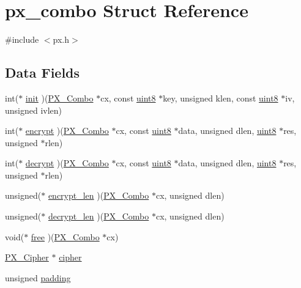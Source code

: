 \hypertarget{structpx__combo}{\section{px\-\_\-combo Struct Reference}
\label{structpx__combo}
}


{\ttfamily \#include $<$px.\-h$>$}

\subsection*{Data Fields}
\begin{DoxyCompactItemize}
\item 
int($\ast$ \hyperlink{structpx__combo_a401b15c0ba6e9cd2ab90b32ea26645ef}{init} )(\hyperlink{px_8h_abd783cad3472aca611fab9e231fd8e89}{P\-X\-\_\-\-Combo} $\ast$cx, const \hyperlink{c_8h_adde6aaee8457bee49c2a92621fe22b79}{uint8} $\ast$key, unsigned klen, const \hyperlink{c_8h_adde6aaee8457bee49c2a92621fe22b79}{uint8} $\ast$iv, unsigned ivlen)
\item 
int($\ast$ \hyperlink{structpx__combo_af74336f8a213474316867f3fcaa31b0b}{encrypt} )(\hyperlink{px_8h_abd783cad3472aca611fab9e231fd8e89}{P\-X\-\_\-\-Combo} $\ast$cx, const \hyperlink{c_8h_adde6aaee8457bee49c2a92621fe22b79}{uint8} $\ast$data, unsigned dlen, \hyperlink{c_8h_adde6aaee8457bee49c2a92621fe22b79}{uint8} $\ast$res, unsigned $\ast$rlen)
\item 
int($\ast$ \hyperlink{structpx__combo_a23e2efbb8021fe4633dad4bf6c4bdd9c}{decrypt} )(\hyperlink{px_8h_abd783cad3472aca611fab9e231fd8e89}{P\-X\-\_\-\-Combo} $\ast$cx, const \hyperlink{c_8h_adde6aaee8457bee49c2a92621fe22b79}{uint8} $\ast$data, unsigned dlen, \hyperlink{c_8h_adde6aaee8457bee49c2a92621fe22b79}{uint8} $\ast$res, unsigned $\ast$rlen)
\item 
unsigned($\ast$ \hyperlink{structpx__combo_a5d77b2bb0597cc58b5a03a17cacddd6e}{encrypt\-\_\-len} )(\hyperlink{px_8h_abd783cad3472aca611fab9e231fd8e89}{P\-X\-\_\-\-Combo} $\ast$cx, unsigned dlen)
\item 
unsigned($\ast$ \hyperlink{structpx__combo_a5255ab7d3977adcfb1ef250c1ae8750b}{decrypt\-\_\-len} )(\hyperlink{px_8h_abd783cad3472aca611fab9e231fd8e89}{P\-X\-\_\-\-Combo} $\ast$cx, unsigned dlen)
\item 
void($\ast$ \hyperlink{structpx__combo_a47f3f63a1e165cbb460cbba11b6abe1c}{free} )(\hyperlink{px_8h_abd783cad3472aca611fab9e231fd8e89}{P\-X\-\_\-\-Combo} $\ast$cx)
\item 
\hyperlink{px_8h_a971b71d1dd84736bdccbc92805c3d018}{P\-X\-\_\-\-Cipher} $\ast$ \hyperlink{structpx__combo_a63135da76b1246d73c2636e7bc61e8e0}{cipher}
\item 
unsigned \hyperlink{structpx__combo_a253ba1f3900b1fdcf82ead9d1d5d5231}{padding}
\end{DoxyCompactItemize}


